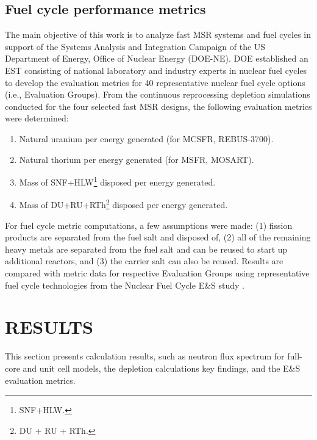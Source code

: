 \documentclass[letterpaper]{mandc2019}
\begin{document}
\subsection{Fuel cycle performance metrics}
\label{sec:metrics}
The main objective of this work is to analyze fast \gls{MSR} systems and fuel cycles in support of the Systems Analysis and Integration Campaign of the US Department of Energy, Office of Nuclear Energy (DOE-NE). 
DOE established an \gls{EST} consisting of national laboratory and industry experts in nuclear fuel cycles to develop the evaluation metrics for 40 representative nuclear fuel cycle options (i.e., Evaluation Groups). 
From the continuous reprocessing depletion simulations conducted for the four selected fast \gls{MSR} designs, the following evaluation metrics were determined:
\vspace{-0.25in}
\begin{enumerate}
	\item Natural uranium per energy generated (for \gls{MCSFR}, REBUS-3700).\vspace{-0.11in}
	\item Natural thorium per energy generated (for \gls{MSFR}, \gls{MOSART}).\vspace{-0.11in}
	\item Mass of SNF+HLW\footnote{\gls{SNF}+\gls{HLW}.} disposed per energy generated.\vspace{-0.11in}
	\item Mass of DU+RU+RTh\footnote{\gls{DU} + \gls{RU} + \gls{RTh}.} disposed per energy  generated.\vspace{-0.18in}
\end{enumerate}
For fuel cycle metric computations, a few assumptions were made:
(1) fission products are separated from the fuel salt and disposed of,
(2) all of the remaining heavy metals are separated from the fuel salt and can be reused to start up additional reactors, and
(3) the carrier salt can also be reused.
Results are compared with metric data for respective Evaluation Groups using representative fuel cycle technologies from the Nuclear Fuel Cycle E\&S study \cite{wigeland_nuclear_2014-4}.
\section{RESULTS}
This section presents calculation results, such as neutron flux spectrum for full-core and unit cell models, the depletion calculations key findings, and the E\&S evaluation metrics.
\end{document}
